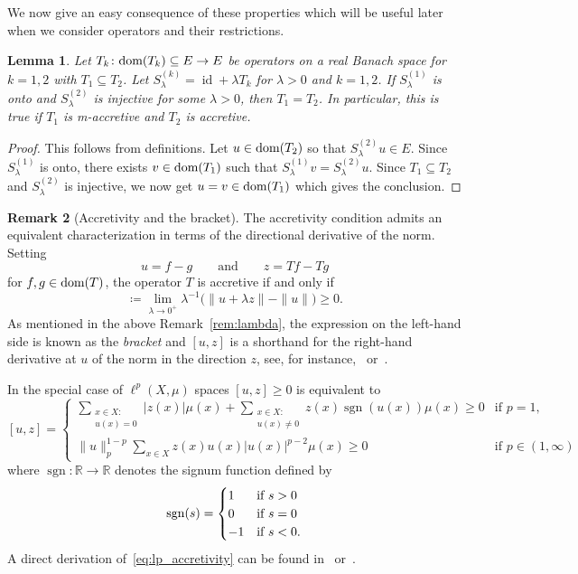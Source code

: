 \documentclass[letterpaper]{article}
\newtheorem{lemma}{Lemma}[section]
\theoremstyle{definition}
\newtheorem{remark}[lemma]{Remark}
\theoremstyle{named}
\numberwithin{equation}{section}
\newcommand{\R}{\mathbb{R}}
\newcommand{\lm}{\lambda}
\newcommand{\sgn}{\operatorname{sgn}}
\newcommand{\dom}{\textnormal{dom}} %
\newcommand{\id}{\operatorname{id}}
\begin{document}
We now give an easy consequence of these properties which will be useful later when we consider operators
and their restrictions.
\begin{lemma}\label{l:inclusion}
    Let $T_k \colon \dom(T_k)\subseteq E \to E$ be operators on a real Banach space for $k=1,2$ with $T_1 \subseteq T_2$.
    Let $S_\lm^{(k)}=\id+\lm T_k$ for $\lm>0$ and $k =1,2$. If $S_\lm^{(1)}$ is onto and $S_\lm^{(2)}$ is injective for some $\lm>0$, then $T_1=T_2$.
    In particular, this is true if $T_1$ is m-accretive and $T_2$ is accretive.
\end{lemma}
\begin{proof}
    This follows from definitions. Let $u \in \dom(T_2)$ so that $S_\lm^{(2)}u \in E$.
    Since $S_\lm^{(1)}$ is onto, there exists $v \in \dom(T_1)$ such that $S_\lm^{(1)}v=S_\lm^{(2)}u$.
    Since $T_1 \subseteq T_2$ and $S_\lm^{(2)}$ is injective, we now get $u=v \in \dom(T_1)$ which gives the conclusion.
\end{proof}


\begin{remark}[Accretivity and the bracket]\label{rem:bracket}
The accretivity condition admits an equivalent characterization in terms of the directional derivative of the norm. Setting
$$
u = f - g \qquad \mbox{and} \qquad z = Tf - Tg
$$
for $f, g \in \dom(T)$,
the operator $T$ is accretive if and only if
\begin{equation*}
 [u, z] \coloneqq \lim_{\lambda\to 0^+} \lambda^{-1}\bigl(\|u + \lambda z\| - \|u\|\bigr) \geq 0.
\end{equation*}
As mentioned in the above Remark~\ref{rem:lambda}, the expression on the left-hand side is known as the \emph{bracket} and $[u,z]$ is a shorthand for the right-hand derivative at $u$ of the norm in the direction $z$, see, for instance,~\cite[Section 2.2 and Theorem 2.15]{benilan1988evolution} or~\cite[Equation~(3.13)]{barbu2010nonlinear}. 

In the special case of $\ell^p(X,\mu)$ spaces $[u,z] \geq 0$ is equivalent to
\begin{equation}\label{eq:lp_accretivity}
[u,z] = \begin{cases}
\displaystyle\sum_{\substack{x \in X : \\ u(x) = 0}} |z(x)| \mu(x) + \displaystyle\sum_{\substack{x \in X : \\ u(x) \neq 0}} z(x) \sgn(u(x)) \mu(x) \geq 0  & \text{if } p = 1, \\[5ex] 
\|u\|_p^{1-p}\displaystyle\sum_{x \in X} z(x) u(x) |u(x)|^{p-2} \mu(x) \geq 0 & \text{if }  p \in (1, \infty)
\end{cases}
\end{equation}
where $\sgn\colon \R \to \R$ denotes the signum function defined by
$$\sgn(s)=
\begin{cases}
    1 &\textup{if } s>0 \\
    0 &\textup{if } s=0 \\
    -1 &\textup{if } s<0.
\end{cases}$$ 
A direct derivation of~\eqref{eq:lp_accretivity} can be found in~\cite[Example~(2.8)]{benilan1988evolution} or~\cite[Remark~3]{bianchi2022generalized}.
\end{remark}
\end{document}
